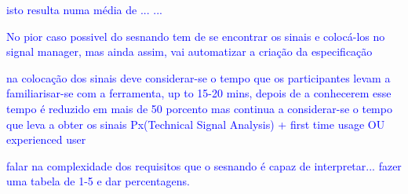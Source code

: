 \textcolor{blue}{ isto resulta numa média de ... ...}

\textcolor{blue}{ No pior caso possivel do sesnando tem de se encontrar os sinais e colocá-los no signal manager, mas ainda assim, vai automatizar a criação da especificação}

\textcolor{blue}{na colocação dos sinais deve considerar-se o tempo que os participantes levam a familiarisar-se com a ferramenta, up to 15-20 mins, depois de a conhecerem esse tempo é reduzido em mais de 50 porcento mas continua a considerar-se o tempo que leva a obter os sinais Px(Technical Signal Analysis) + first time usage OU experienced user}

\textcolor{blue}{falar na complexidade dos requisitos que o sesnando é capaz de interpretar... fazer uma tabela de 1-5 e dar percentagens.}





